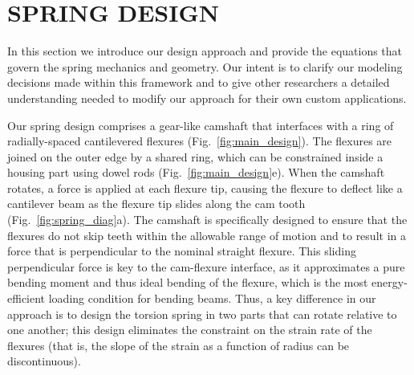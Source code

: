 \documentclass[letterpaper, 10 pt, conference]{ieeeconf} %
\begin{document}
\section{SPRING DESIGN}

In this section we introduce our design approach and provide the equations that govern the spring mechanics and geometry. Our intent is to clarify our modeling decisions made within this framework and to give other researchers a detailed understanding needed to modify our approach for their own custom applications.



Our spring design comprises a gear-like camshaft that interfaces with a ring of radially-spaced cantilevered flexures (Fig.~\ref{fig:main_design}). The flexures are joined on the outer edge by a shared ring, which can be constrained inside a housing part using dowel rods (Fig.~\ref{fig:main_design}e). When the camshaft rotates, a force is applied at each flexure tip, causing the flexure to deflect like a cantilever beam as the flexure tip slides along the cam tooth (Fig.~\ref{fig:spring_diag}a). The camshaft is specifically designed to ensure that the flexures do not skip teeth within the allowable range of motion and to result in a force that is perpendicular to the nominal straight flexure. This sliding perpendicular force is key to the cam-flexure interface, as it approximates a pure bending moment and thus ideal bending of the flexure, which is the most energy-efficient loading condition for bending beams. Thus, a key difference in our approach is to design the torsion spring in two parts that can rotate relative to one another; this design eliminates the constraint on the strain rate of the flexures (that is, the slope of the strain as a function of radius can be discontinuous).
\end{document}
